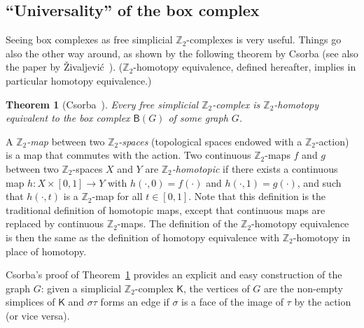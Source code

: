 \documentclass[12pt]{amsart}
\newtheorem{theorem}{Theorem}[section]
\theoremstyle{definition}
\def\Z{\mathbb{Z}}
\def\K{\mathsf{K}}
\def\B{\mathsf{B}}
\begin{document}
\subsection{``Universality'' of the box complex}\label{subsec:univers}

Seeing box complexes as free simplicial $\Z_2$-complexes is very useful. Things go also the other way around, as shown by the following theorem by Csorba (see also the paper by \v Zivaljevi\' c~\cite{vzivaljevic2005wi}). ($\Z_2$-homotopy equivalence, defined hereafter, implies in particular homotopy equivalence.)

\begin{theorem}[Csorba~\cite{csorba2007homotopy}]\label{thm:csorba}
Every free simplicial $\Z_2$-complex is $\Z_2$-homotopy equivalent to the box complex $\B(G)$ of some graph $G$.
\end{theorem}

A \emph{$\Z_2$-map} between two \emph{$\Z_2$-spaces} (topological spaces endowed with a $\Z_2$-action) is a map that commutes with the action. Two continuous $\Z_2$-maps $f$ and $g$ between two $\Z_2$-spaces $X$ and $Y$ are \emph{$\Z_2$-homotopic} if there exists a continuous map $h\colon X\times[0,1] \rightarrow Y$ with $h(\cdot,0)=f(\cdot)$ and $h(\cdot,1)=g(\cdot)$, and such that $h(\cdot,t)$ is a $\Z_2$-map for all $t\in[0,1]$. Note that this definition is the traditional definition of homotopic maps, except that continuous maps are replaced by continuous $\Z_2$-maps. The definition of the $\Z_2$-homotopy equivalence is then the same as the definition of homotopy equivalence with $\Z_2$-homotopy in place of homotopy.

Csorba's proof of Theorem~\ref{thm:csorba} provides an explicit and easy construction of the graph $G$: given a simplicial $\Z_2$-complex $\K$, the vertices of $G$ are the non-empty simplices of $\K$ and $\sigma\tau$ forms an edge if $\sigma$ is a face of the image of $\tau$ by the action (or vice versa). 
\end{document}
